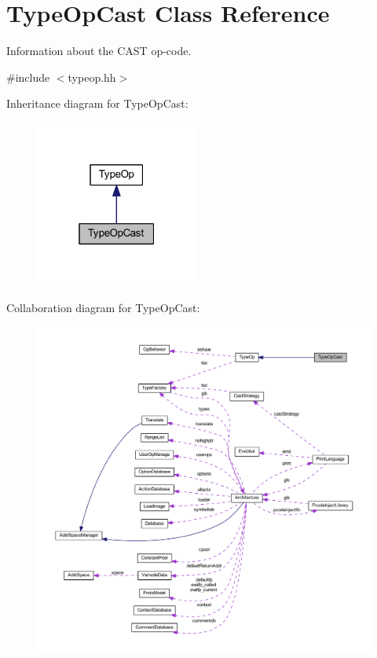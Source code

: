 \hypertarget{class_type_op_cast}{}\section{Type\+Op\+Cast Class Reference}
\label{class_type_op_cast}


Information about the C\+A\+ST op-\/code.  




{\ttfamily \#include $<$typeop.\+hh$>$}



Inheritance diagram for Type\+Op\+Cast\+:
\nopagebreak
\begin{figure}[H]
\begin{center}
\leavevmode
\includegraphics[width=151pt]{class_type_op_cast__inherit__graph}
\end{center}
\end{figure}


Collaboration diagram for Type\+Op\+Cast\+:
\nopagebreak
\begin{figure}[H]
\begin{center}
\leavevmode
\includegraphics[width=350pt]{class_type_op_cast__coll__graph}
\end{center}
\end{figure}
